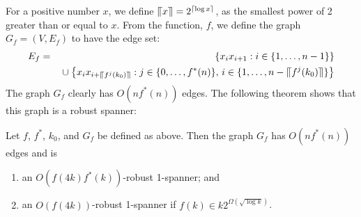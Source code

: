 \documentclass[final]{siamltex}
\newcommand{\upen}[1]{\llceil#1\rrceil}
\begin{document}
For a positive number $x$, we define $\upen{x}=2^{\ceil{\log x}}$, as
the smallest power of 2 greater than or equal to $x$.  From the function,
$f$, we define the graph $G_f=(V,E_f)$ to have the edge set:
\begin{eqnarray*}
    E_f &=& \quad\left\{ x_ix_{i+1} : i\in\{1,\ldots,n-1\} \right\} \\
     && {} \cup \left\{ x_{i}x_{i+\upen{f^j(k_0)}} : j\in\{0,\ldots,f^*(n)\},\,
        i\in\{1,\ldots,n-\upen{f^j(k_0)}\} \right\}
\end{eqnarray*}
The graph $G_f$ clearly has $O(nf^*(n))$ edges.  The following theorem
shows that this graph is a robust spanner:

\begin{thm}
  Let $f$, $f^*$, $k_0$, and $G_f$ be defined as above.  Then the graph
  $G_f$ has $O(nf^*(n))$ edges and is
  \begin{enumerate}
    \item an $O(f(4k)f^*(k))$-robust 1-spanner; and 
    \item an $O(f(4k))$-robust 1-spanner if $f(k)\in k2^{\Omega(\sqrt{\log k})}$.
  \end{enumerate}
\end{thm}
\end{document}
